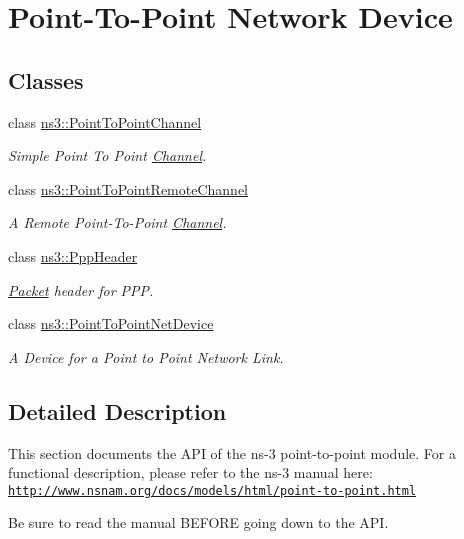 \hypertarget{group__point-to-point}{}\section{Point-\/\+To-\/\+Point Network Device}
\label{group__point-to-point}
\subsection*{Classes}
\begin{DoxyCompactItemize}
\item 
class \hyperlink{classns3_1_1PointToPointChannel}{ns3\+::\+Point\+To\+Point\+Channel}
\begin{DoxyCompactList}\small\item\em Simple Point To Point \hyperlink{classns3_1_1Channel}{Channel}. \end{DoxyCompactList}\item 
class \hyperlink{classns3_1_1PointToPointRemoteChannel}{ns3\+::\+Point\+To\+Point\+Remote\+Channel}
\begin{DoxyCompactList}\small\item\em A Remote Point-\/\+To-\/\+Point \hyperlink{classns3_1_1Channel}{Channel}. \end{DoxyCompactList}\item 
class \hyperlink{classns3_1_1PppHeader}{ns3\+::\+Ppp\+Header}
\begin{DoxyCompactList}\small\item\em \hyperlink{classns3_1_1Packet}{Packet} header for P\+PP. \end{DoxyCompactList}\item 
class \hyperlink{classns3_1_1PointToPointNetDevice}{ns3\+::\+Point\+To\+Point\+Net\+Device}
\begin{DoxyCompactList}\small\item\em A Device for a Point to Point Network Link. \end{DoxyCompactList}\end{DoxyCompactItemize}


\subsection{Detailed Description}
This section documents the A\+PI of the ns-\/3 point-\/to-\/point module. For a functional description, please refer to the ns-\/3 manual here\+: \href{http://www.nsnam.org/docs/models/html/point-to-point.html}{\tt http\+://www.\+nsnam.\+org/docs/models/html/point-\/to-\/point.\+html}

Be sure to read the manual B\+E\+F\+O\+RE going down to the A\+PI. 